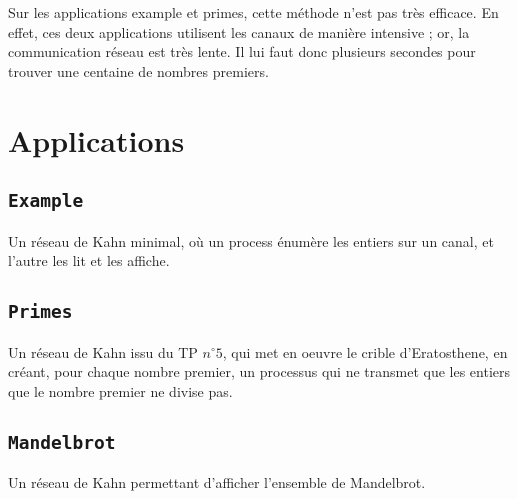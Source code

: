 \documentclass[11pt,a4paper]{article}
\renewcommand{\tt}[1]{\texttt{#1}}
\begin{document}
Sur les applications example et primes, cette méthode n'est pas très efficace.
En effet, ces deux applications utilisent les canaux de manière intensive ; or,
la communication réseau est très lente. Il lui faut donc plusieurs secondes pour
trouver une centaine de nombres premiers.



\section{Applications}


\subsection{\tt{Example}}

Un réseau de Kahn minimal, où un process énumère les entiers sur un canal, et
l'autre les lit et les affiche.


\subsection{\tt{Primes}}

Un réseau de Kahn issu du TP $n^\circ 5$, qui met en oeuvre le crible d'Eratosthene,
en créant, pour chaque nombre premier, un processus qui ne transmet que les
entiers que le nombre premier ne divise pas.

\subsection{\tt{Mandelbrot}}

Un réseau de Kahn permettant d'afficher l'ensemble de Mandelbrot.
\end{document}
